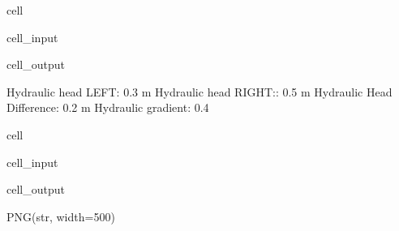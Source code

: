 \documentclass[letterpaper,10pt,english]{jupyterBook}
\begin{document}
\begin{sphinxuseclass}{cell}
\begin{sphinxVerbatimInput}
\begin{sphinxuseclass}{cell_input}
\end{sphinxuseclass}\end{sphinxVerbatimInput}
\begin{sphinxVerbatimOutput}

\begin{sphinxuseclass}{cell_output}
\begin{sphinxVerbatim}[commandchars=\\\{\}]
Hydraulic head LEFT: 0.3 m
Hydraulic head RIGHT:: 0.5 m
Hydraulic Head Difference: 0.2 m
Hydraulic gradient: 0.4
\end{sphinxVerbatim}

\end{sphinxuseclass}\end{sphinxVerbatimOutput}

\end{sphinxuseclass}
\begin{sphinxuseclass}{cell}\begin{sphinxVerbatimInput}

\begin{sphinxuseclass}{cell_input}
\begin{sphinxVerbatim}[commandchars=\\\{\}]
   
\end{sphinxVerbatim}

\end{sphinxuseclass}\end{sphinxVerbatimInput}
\begin{sphinxVerbatimOutput}

\begin{sphinxuseclass}{cell_output}
\begin{sphinxVerbatim}[commandchars=\\\{\}]
PNG(str, width=500)
\end{sphinxVerbatim}

\end{sphinxuseclass}\end{sphinxVerbatimOutput}

\end{sphinxuseclass}
\end{document}
